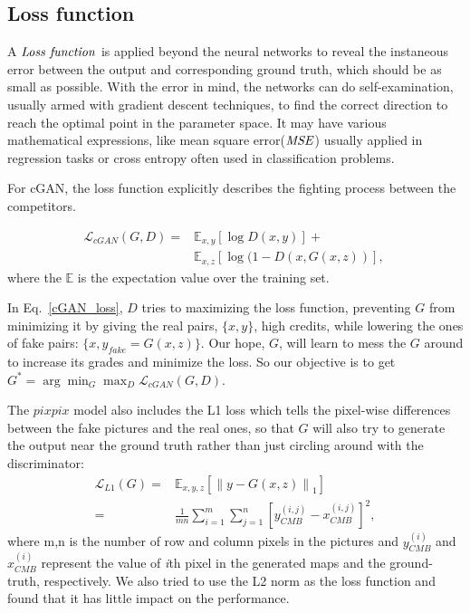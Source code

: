 \documentclass[floatfix]{emulateapj}
\newcommand{\norm}[1]{\left\lVert#1\right\rVert}
\begin{document}
\subsection{Loss function}\label{sect:loss}

A $\it{Loss\ function}$ is applied beyond the neural networks to reveal the instaneous error between the output and corresponding ground truth, which should be as small as possible. With the error in mind, the networks can do self-examination, usually armed with gradient descent techniques, to find the correct direction to reach the optimal point in the parameter space. It may have various mathematical expressions, like mean square error($\it{MSE}$) usually applied in regression tasks or cross entropy often used in classification problems.

For cGAN, the loss function  explicitly describes the fighting process between the competitors. 

\begin{align}\label{cGAN_loss}
    \mathcal{L}_{cGAN}(G,D) = &\mathbb{E}_{x,y}[\log D(x,y)] + \nonumber \\
                 &\mathbb{E}_{x,z}[\log (1-D(x,G(x,z))],\
\end{align}
where the $\mathbb{E}$ is the expectation value over the training set.

In Eq.~\ref{cGAN_loss}, $D$ tries to maximizing the loss function, preventing $G$ from minimizing it by giving the real pairs, $\{x,y\}$, high credits, while lowering the ones of fake pairs: $\{x, y_{fake} = G(x,z)\}$. Our hope, $G$, will learn to mess the $G$ around to increase its grades and minimize the loss. So our objective is to get $G^*  = \arg\min_G \max_D \mathcal{L}_{cGAN}(G,D)$.

The $pixpix$ model also includes the L1 loss which tells the pixel-wise differences between the fake pictures and the real ones, so that $G$ will also try to generate the output near the ground truth rather than just circling around with the discriminator:
\begin{equation}
\begin{split}
    \mathcal{L}_{L1}(G) = &\mathbb{E}_{x,y,z}[\norm{y-G(x,z)}_1] \\
    =&\frac{1}{mn}\sum_{i=1}^{m} \sum_{j=1}^{n} {[y_{CMB}^{(i,j)} - x_{CMB}^{(i,j)}]^2}, \label{L1_equation} 
\end{split}   
\end{equation}
where m,n is the number of row and column pixels in the pictures and $y_{CMB}^{(i)}$ and $x_{CMB}^{(i)}$ represent the value of \textit{i}th pixel in the generated maps and the ground-truth, respectively.  
We also tried to use the L2 norm as the loss function and found that it has little impact on the performance.
\end{document}
